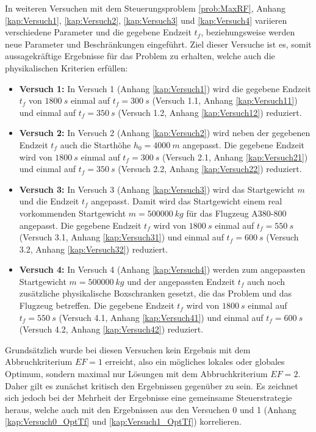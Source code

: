 In weiteren Versuchen mit dem Steuerungsproblem \ref{prob:MaxRF}, Anhang \ref{kap:Versuch1}, \ref{kap:Versuch2}, \ref{kap:Versuch3} und \ref{kap:Versuch4} variieren verschiedene Parameter und die gegebene Endzeit $t_f$, beziehungsweise werden neue Parameter und Beschränkungen eingeführt. Ziel dieser Versuche ist es, somit aussagekräftige Ergebnisse für das Problem zu erhalten, welche auch die physikalischen Kriterien erfüllen:
\begin{itemize}
\item \textbf{Versuch 1:} In Versuch 1 (Anhang \ref{kap:Versuch1}) wird die gegebene Endzeit $t_f$ von $1800 \ s$ einmal auf $t_f = 300 \ s$ (Versuch 1.1, Anhang \ref{kap:Versuch11}) und einmal auf $t_f = 350 \ s$ (Versuch 1.2, Anhang \ref{kap:Versuch12}) reduziert. 
%
\item \textbf{Versuch 2:} In Versuch 2 (Anhang \ref{kap:Versuch2}) wird neben der gegebenen Endzeit $t_f$ auch die Starthöhe $h_0 = 4000 \ m$ angepasst. Die gegebene Endzeit wird von $1800 \ s$ einmal auf $t_f = 300 \ s$ (Versuch 2.1, Anhang \ref{kap:Versuch21}) und einmal auf $t_f = 350 \ s$ (Versuch 2.2, Anhang \ref{kap:Versuch22}) reduziert.
%
\item \textbf{Versuch 3:} In Versuch 3 (Anhang \ref{kap:Versuch3}) wird das Startgewicht $m$ und die Endzeit $t_f$ angepasst. Damit wird das Startgewicht einem real vorkommenden Startgewicht $m = 500000 \ kg$ für das Flugzeug A380-800 angepasst. Die gegebene Endzeit $t_f$ wird von $1800 \ s$ einmal auf $t_f = 550 \ s$ (Versuch 3.1, Anhang \ref{kap:Versuch31}) und einmal auf $t_f = 600 \ s$ (Versuch 3.2, Anhang \ref{kap:Versuch32}) reduziert.
%
\item \textbf{Versuch 4:} In Versuch 4 (Anhang \ref{kap:Versuch4}) werden zum angepassten Startgewicht $m = 500000 \ kg$ und der angepassten Endzeit $t_f$ auch noch zusätzliche physikalische Boxschranken gesetzt, die das Problem und das Flugzeug betreffen. Die gegebene Endzeit $t_f$ wird von $1800 \ s$ einmal auf $t_f = 550 \ s$ (Versuch 4.1, Anhang \ref{kap:Versuch41}) und einmal auf $t_f = 600 \ s$ (Versuch 4.2, Anhang \ref{kap:Versuch42}) reduziert.
\end{itemize}
Grundsätzlich wurde bei diesen Versuchen kein Ergebnis mit dem Abbruchkriterium $EF = 1$ erreicht, also ein mögliches lokales oder globales Optimum, sondern maximal nur Lösungen mit dem Abbruchkriterium $EF = 2$. Daher gilt es zunächst kritisch den Ergebnissen gegenüber zu sein. Es zeichnet sich jedoch bei der Mehrheit der Ergebnisse eine gemeinsame Steuerstrategie heraus, welche auch mit den Ergebnissen aus den Versuchen 0 und 1 (Anhang \ref{kap:Versuch0_OptTf} und \ref{kap:Versuch1_OptTf}) korrelieren.

